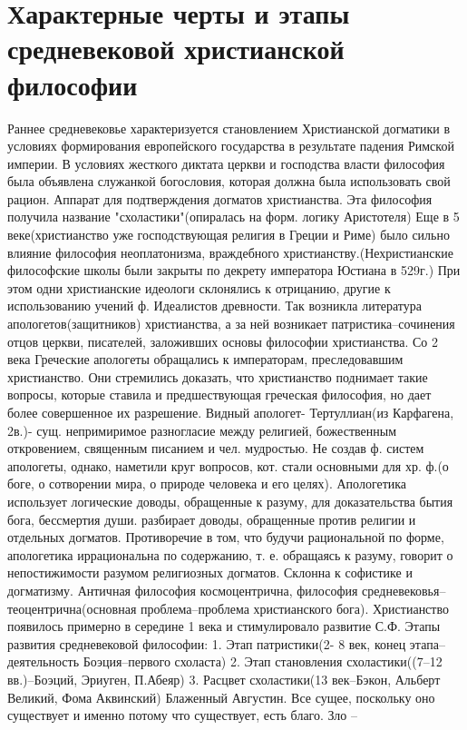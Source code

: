 \documentclass[12pt]{article}
\begin{document}
\section{Характерные черты и этапы средневековой христианской философии}
Раннее средневековье характеризуется становлением Христианской догматики в условиях формирования
европейского государства в результате падения Римской империи. В условиях жесткого диктата церкви и
господства власти философия была объявлена служанкой богословия, которая должна была использовать свой
рацион. Аппарат для подтверждения догматов христианства. Эта философия получила название
"схоластики"(опиралась на форм. логику Аристотеля)
Еще в 5 веке(христианство уже господствующая религия в Греции и Риме) было сильно влияние философия
неоплатонизма, враждебного христианству.(Нехристианские философские школы были закрыты по декрету
императора Юстиана в 529г.) При этом одни христианские идеологи склонялись к отрицанию, другие к 
использованию учений ф. Идеалистов древности. Так возникла литература апологетов(защитников)
христианства, а за ней возникает патристика–сочинения отцов церкви, писателей, заложивших основы
философии христианства.
Со 2 века Греческие апологеты обращались к императорам, преследовавшим христианство. Они стремились
доказать, что христианство поднимает такие вопросы, которые ставила и предшествующая греческая
философия, но дает более совершенное их разрешение. Видный апологет- Тертуллиан(из Карфагена, 2в.)- сущ.
непримиримое разногласие между религией, божественным откровением, священным писанием и чел.
мудростью. Не создав ф. систем апологеты, однако, наметили круг вопросов, кот. стали основными для хр. ф.(о
боге, о сотворении мира, о природе человека и его целях). Апологетика использует логические доводы,
обращенные к разуму, для доказательства бытия бога, бессмертия души. разбирает доводы, обращенные против
религии и отдельных догматов. Противоречие в том, что будучи рациональной по форме, апологетика
иррациональна по содержанию, т. е. обращаясь к разуму, говорит о непостижимости разумом религиозных
догматов.
Склонна к софистике и догматизму.
Античная философия космоцентрична, философия средневековья–теоцентрична(основная проблема–проблема
христианского бога). Христианство появилось примерно в середине 1 века и стимулировало развитие С.Ф.
Этапы развития средневековой философии:
1. Этап патристики(2- 8 век, конец этапа–деятельность Боэция–первого схоласта)
2. Этап становления схоластики((7–12 вв.)–Боэций, Эриуген, П.Абеяр)
3. Расцвет схоластики(13 век–Бэкон, Альберт Великий, Фома Аквинский)
Блаженный Августин. Все сущее, поскольку оно существует и именно потому что существует, есть благо. Зло –
\end{document}
